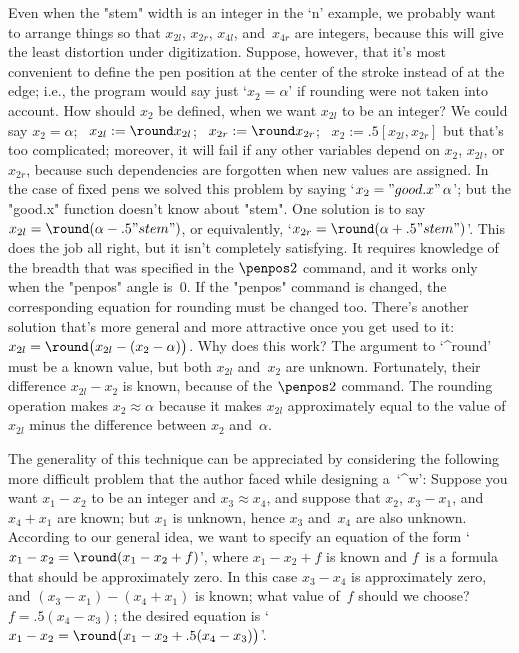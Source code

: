 \danger Even when the "stem" width is an integer in the `n' example,
we probably want to arrange things so that $x_{2l}$, $x_{2r}$, $x_{4l}$,
and~$x_{4r}$ are integers, because this will give the least distortion
under digitization. Suppose, however, that it's most convenient to define
the pen position at the center of the stroke instead of at the edge; i.e.,
the program would say just `$x_2=\alpha$' if rounding were not taken into
account. How should $x_2$ be defined, when we want $x_{2l}$ to be an
integer? We could say
\begindisplay
$x_2=\alpha$; \ $x_{2l}:=\round x_{2l}$; \ $x_{2r}:=\round x_{2r}$; \
$x_2:=.5[x_{2l},x_{2r}]$
\enddisplay
but that's too complicated; moreover, it will fail if any other
variables depend on $x_2$, $x_{2l}$, or $x_{2r}$, because such
dependencies are forgotten when new values are assigned.
In the case of fixed pens we solved this problem by saying
`$x_2="good.x"\,\alpha$'; but the "good.x" function doesn't know
about "stem". One solution is to say
\begindisplay
$x_{2l}=\round(\alpha-.5"stem")$,
\enddisplay
or equivalently, `$x_{2r}=\round(\alpha+.5"stem")$'. This does the
job all right, but it isn't completely satisfying. It requires
knowledge of the breadth that was specified in the $\penpos2$ command,
and it works only when the "penpos" angle is~0. If the "penpos" command
is changed, the corresponding equation for rounding must be
changed too. There's another solution that's more general and more
attractive once you get used to it:
\begindisplay
$x_{2l}=\round\bigl(x_{2l}-(x_2-\alpha)\bigr)$.
\enddisplay
Why does this work? The argument to `^{round}' must be a known value,
but both $x_{2l}$ and~$x_2$ are unknown. Fortunately, their difference
$x_{2l}-x_2$ is known, because of the $\penpos2$ command. The
rounding operation makes $x_2\approx\alpha$ because it makes $x_{2l}$
approximately equal to the value of $x_{2l}$ minus the difference
between $x_2$ and~$\alpha$.

\ddangerexercise The generality of this technique can be appreciated
by considering the following more difficult problem that the author
faced while designing a~`^{w}': Suppose you want $x_1-x_2$ to be
an integer and $x_3\approx x_4$, and suppose that $x_2$, $x_3-x_1$,
and~$x_4+x_1$ are known; but $x_1$ is unknown, hence $x_3$ and~$x_4$
are also unknown. According to our general idea, we want to specify an
equation of the form `$x_1-x_2=\round(x_1-x_2+f)$', where $x_1-x_2+f$
is known and $f$~is a formula that should be approximately zero.
In this case $x_3-x_4$ is approximately zero, and $(x_3-x_1)-(x_4+x_1)$
is known; what value of~$f$ should we choose?
\answer $f=.5(x_4-x_3)$; the desired equation is
`$x_1-x_2=\round\bigl(x_1-x_2+.5(x_4-x_3)\bigr)$'.

